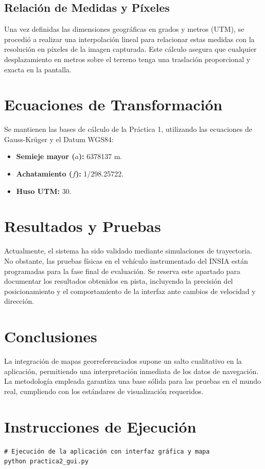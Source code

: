 \documentclass[10pt]{article}
\begin{document}
\subsection{Relación de Medidas y Píxeles}
Una vez definidas las dimensiones geográficas en grados y metros (UTM), se procedió a realizar una interpolación lineal para relacionar estas medidas con la resolución en píxeles de la imagen capturada. Este cálculo asegura que cualquier desplazamiento en metros sobre el terreno tenga una traslación proporcional y exacta en la pantalla.

\section{Ecuaciones de Transformación}
Se mantienen las bases de cálculo de la Práctica 1, utilizando las ecuaciones de Gauss-Krüger y el Datum WGS84:
\begin{itemize}[leftmargin=1.2em]
    \item \textbf{Semieje mayor ($a$):} 6378137 m.
    \item \textbf{Achatamiento ($f$):} 1/298.25722.
    \item \textbf{Huso UTM:} 30.
\end{itemize}

\section{Resultados y Pruebas}
Actualmente, el sistema ha sido validado mediante simulaciones de trayectoria. No obstante, las pruebas físicas en el vehículo instrumentado del INSIA están programadas para la fase final de evaluación. Se reserva este apartado para documentar los resultados obtenidos en pista, incluyendo la precisión del posicionamiento y el comportamiento de la interfaz ante cambios de velocidad y dirección.

\vspace{5cm} %

\section{Conclusiones}
La integración de mapas georreferenciados supone un salto cualitativo en la aplicación, permitiendo una interpretación inmediata de los datos de navegación. La metodología empleada garantiza una base sólida para las pruebas en el mundo real, cumpliendo con los estándares de visualización requeridos.

\section{Instrucciones de Ejecución}
\begin{lstlisting}[style=pythonEstilo]
# Ejecución de la aplicación con interfaz gráfica y mapa
python practica2_gui.py
\end{lstlisting}
\end{document}
